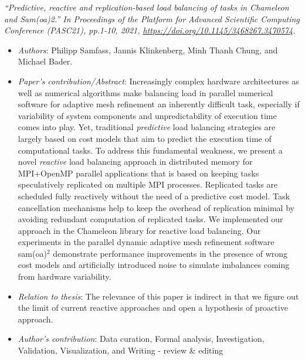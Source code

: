\textit{``Predictive, reactive and replication-based load balancing of tasks in Chameleon and Sam(oa)2.'' In Proceedings of the Platform for Advanced Scientific Computing Conference (PASC21), pp.1-10, 2021, \url{https://doi.org/10.1145/3468267.3470574}.}
\begin{itemize}
	\item \textit{Authors}: Philipp Samfass, Jannis Klinkenberg, Minh Thanh Chung, and Michael Bader.
	\item \textit{Paper's contribution/Abstract}: Increasingly complex hardware architectures as well as numerical algorithms make balancing load in parallel numerical software for adaptive mesh refinement an inherently difficult task, especially if variability of system components and unpredictability of execution time comes into play. Yet, traditional \textit{predictive} load balancing strategies are largely based on cost models that aim to predict the execution time of computational tasks. To address this fundamental weakness, we present a novel \textit{reactive} load balancing approach in distributed memory for MPI+OpenMP parallel applications that is based on keeping tasks speculatively replicated on multiple MPI processes. Replicated tasks are scheduled fully reactively without the need of a predictive cost model. Task cancellation mechanisms help to keep the overhead of replication minimal by avoiding redundant computation of replicated tasks. We implemented our approach in the Chameleon library for reactive load balancing. Our experiments in the parallel dynamic adaptive mesh refinement software sam(oa)$^2$ demonstrate performance improvements in the presence of wrong cost models and artificially introduced noise to simulate imbalances coming from hardware variability.
	\item \textit{Relation to thesis}: The relevance of this paper is indirect in that we figure out the limit of current reactive approaches and open a hypothesis of proactive approach.
	\item \textit{Author's contribution}: Data curation, Formal analysis, Investigation, Validation, Visualization, and Writing - review \& editing
\end{itemize}

